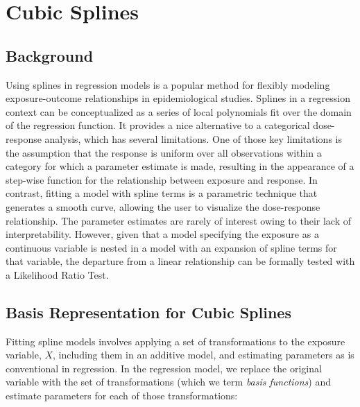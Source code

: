 \documentclass{article}
\begin{document}
\section{Cubic Splines}
\subsection{Background} %
\hspace{\parindent} Using splines in regression models is a popular method for flexibly modeling exposure-outcome relationships in epidemiological studies. \supercite{greenland_dose-response_1995, witte_nested_1997} Splines in a regression context can be conceptualized as a series of local polynomials fit over the domain of the regression function. It provides a nice alternative to a categorical dose-response analysis, which has several limitations. One of those key limitations is the assumption that the response is uniform over all observations within a category for which a parameter estimate is made, resulting in the appearance of a step-wise function for the relationship between exposure and response. \supercite{steenland_practical_2004} In contrast, fitting a model with spline terms is a parametric technique that generates a smooth curve, allowing the user to visualize the dose-response relationship. The parameter estimates are rarely of interest owing to their lack of interpretability. \supercite{steenland_practical_2004} However, given that a model specifying the exposure as a continuous variable is nested in a model with an expansion of spline terms for that variable, the departure from a linear relationship can be formally tested with a Likelihood Ratio Test.\supercite{witte_nested_1997}

\vspace{0.5cm} %
\subsection{Basis Representation for Cubic Splines} %
\hspace{\parindent} Fitting spline models involves applying a set of transformations to the exposure variable, $X$, including them in an additive model, and estimating parameters as is conventional in regression. In the regression model, we replace the original variable with the set of transformations (which we term \textit{basis functions}) and estimate parameters for each of those transformations:
\end{document}
